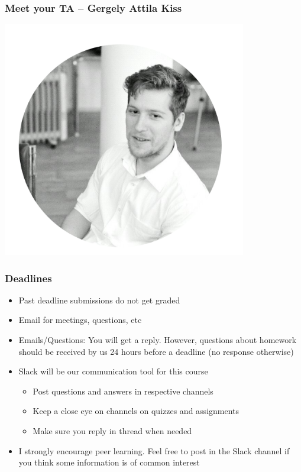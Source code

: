\documentclass[compress, aspectratio=54]{beamer}
\begin{document}
\begin{frame}
\frametitle{Meet your TA -- Gergely Attila Kiss}
\begin{center}
    \includegraphics[width=0.8\textwidth]{Figures/geri.png}
\end{center}
\end{frame}


\begin{frame}
\frametitle{Deadlines}
\begin{itemize}
\item Past deadline submissions do not get graded
\item Email for meetings, questions, etc 
\item Emails/Questions: You will get a reply. However, questions about homework should be received by us 24 hours before a deadline (no response otherwise)
\item Slack will be our communication tool for this course
\begin{itemize}
\item Post questions and answers in respective channels
\item Keep a close eye on channels on quizzes and assignments
\item Make sure you reply in thread when needed
\end{itemize}
\item  I strongly encourage peer learning. Feel free to post in the Slack channel if you think some information is of common interest
\end{itemize}
\end{frame}
\end{document}

